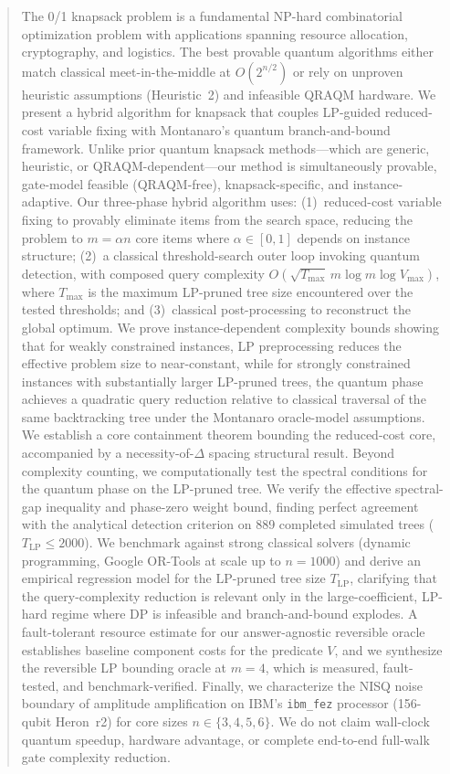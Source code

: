 \documentclass[conference]{IEEEtran}
\begin{document}
\begin{abstract} The 0/1 knapsack problem is a fundamental NP-hard combinatorial optimization problem with applications spanning resource allocation, cryptography, and logistics. The best provable quantum algorithms either match classical meet-in-the-middle at $O(2^{n/2})$ or rely on unproven heuristic assumptions (Heuristic~2) and infeasible QRAQM hardware. We present a hybrid algorithm for knapsack that couples LP-guided reduced-cost variable fixing with Montanaro's quantum branch-and-bound framework. Unlike prior quantum knapsack methods---which are generic, heuristic, or QRAQM-dependent---our method is simultaneously provable, gate-model feasible (QRAQM-free), knapsack-specific, and instance-adaptive. Our three-phase hybrid algorithm uses: (1)~reduced-cost variable fixing to provably eliminate items from the search space, reducing the problem to $m = \alpha n$ core items where $\alpha \in [0, 1]$ depends on instance structure; (2)~a classical threshold-search outer loop invoking quantum detection, with composed query complexity $O\!\left(\sqrt{T_{\max}}\,m\log m\log V_{\max}\right)$, where $T_{\max}$ is the maximum LP-pruned tree size encountered over the tested thresholds; and (3)~classical post-processing to reconstruct the global optimum. We prove instance-dependent complexity bounds showing that for weakly constrained instances, LP preprocessing reduces the effective problem size to near-constant, while for strongly constrained instances with substantially larger LP-pruned trees, the quantum phase achieves a quadratic query reduction relative to classical traversal of the same backtracking tree under the Montanaro oracle-model assumptions. We establish a core containment theorem bounding the reduced-cost core, accompanied by a necessity-of-$\Delta$ spacing structural result. Beyond complexity counting, we computationally test the spectral conditions for the quantum phase on the LP-pruned tree. We verify the effective spectral-gap inequality and phase-zero weight bound, finding perfect agreement with the analytical detection criterion on 889 completed simulated trees ($T_{\text{LP}} \le 2000$). We benchmark against strong classical solvers (dynamic programming, Google OR-Tools at scale up to $n=1000$) and derive an empirical regression model for the LP-pruned tree size $T_{\text{LP}}$, clarifying that the query-complexity reduction is relevant only in the large-coefficient, LP-hard regime where DP is infeasible and branch-and-bound explodes. A fault-tolerant resource estimate for our answer-agnostic reversible oracle establishes baseline component costs for the predicate $V$, and we synthesize the reversible LP bounding oracle at $m=4$, which is measured, fault-tested, and benchmark-verified. Finally, we characterize the NISQ noise boundary of amplitude amplification on IBM's \texttt{ibm\_fez} processor (156-qubit Heron~r2) for core sizes $n \in \{3, 4, 5, 6\}$. We do not claim wall-clock quantum speedup, hardware advantage, or complete end-to-end full-walk gate complexity reduction. \end{abstract}
\end{document}
